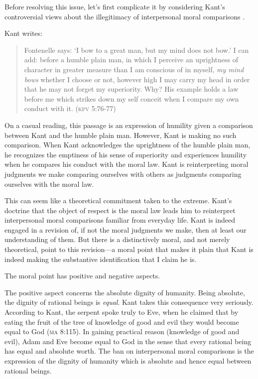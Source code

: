 \documentclass[a4paper,12pt]{article}
\begin{document}
Before resolving this issue, let's first complicate it by considering Kant's controversial views about the illegitimacy of interpersonal moral comparisons \citep[see][ch.~4, \S6]{Wood:1999zy}.

Kant writes: 
\begin{quote}
	Fontenelle says: `I bow to a great man, but my mind does not bow.' I can add: before a humble plain man, in which I perceive an uprightness of character in greater measure than I am conscious of in myself, \emph{my mind bows} whether I choose or not, however high I may carry my head in order that he may not forget my superiority. Why? His example holds a law before me which strikes down my self conceit when I compare my own conduct with it. (\textsc{kpv} 5:76-77) 
\end{quote}

On a casual reading, this passage is an expression of humility given a comparison between Kant and the humble plain man. However, Kant is making no such comparison. When Kant acknowledges the uprightness of the humble plain man, he recognizes the emptiness of his sense of superiority and experiences humility when he compares his conduct with the moral law. Kant is reinterpreting moral judgments we make comparing ourselves with others as judgments comparing ourselves with the moral law.

This can seem like a theoretical commitment taken to the extreme. Kant's doctrine that the object of respect is the moral law leads him to reinterpret interpersonal moral comparisons familiar from everyday life. Kant is indeed engaged in a revision of, if not the moral judgments we make, then at least our understanding of them. But there is a distinctively moral, and not merely theoretical, point to this revision---a moral point that makes it plain that Kant is indeed making the substantive identification that I claim he is.

The moral point has positive and negative aspects.

The positive aspect concerns the absolute dignity of humanity. Being absolute, the dignity of rational beings is \emph{equal}. Kant takes this consequence very seriously. According to Kant, the serpent spoke truly to Eve, when he claimed that by eating the fruit of the tree of knowledge of good and evil they would become equal to God (\textsc{ma} 8:115). In gaining practical reason (knowledge of good and evil), Adam and Eve become equal to God in the sense that every rational being has equal and absolute worth. The ban on interpersonal moral comparisons is the expression of the dignity of humanity which is absolute and hence equal between rational beings.
\end{document}
